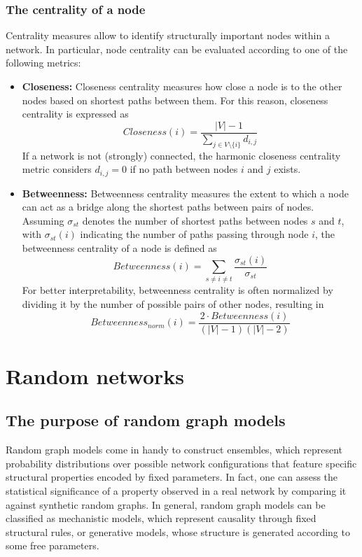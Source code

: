 \documentclass{report}
\begin{document}
\subsection{The centrality of a node}
Centrality measures allow to identify structurally important nodes within a network. \newline
In particular, node centrality can be evaluated according to one of the following metrics:
\begin{itemize}
    \item \textbf{Closeness: }Closeness centrality measures how close a node is to the other nodes based on shortest paths between them. \newline
    For this reason, closeness centrality is expressed as
    \[Closeness(i) = \frac{|V| - 1}{\sum_{j \in V \setminus \{i\}} d_{i, j}}\]
    If a network is not (strongly) connected, the harmonic closeness centrality metric considers $\displaystyle d_{i, j} = 0$ if no path between nodes $\displaystyle i$ and $\displaystyle j$ exists.
    \item \textbf{Betweenness: }Betweenness centrality measures the extent to which a node can act as a bridge along the shortest paths between pairs of nodes. \newline
    Assuming $\displaystyle \sigma_{st}$ denotes the number of shortest paths between nodes $\displaystyle s$ and $\displaystyle t$, with $\displaystyle \sigma_{st}(i)$ indicating the number of paths passing through node $\displaystyle i$, the betweenness centrality of a node is defined as
    \[Betweenness(i) = \sum_{s \neq i \neq t} \frac{\sigma_{st}(i)}{\sigma_{st}}\]
    For better interpretability, betweenness centrality is often normalized by dividing it by the number of possible pairs of other nodes, resulting in
    \[Betweenness_{norm}(i) = \frac{2 \cdot Betweenness(i)}{(|V| - 1)(|V| - 2)}\]
\end{itemize}

\chapter{Random networks}
\section{The purpose of random graph models}
Random graph models come in handy to construct ensembles, which represent probability distributions over possible network configurations that feature specific structural properties encoded by fixed parameters. \newline
In fact, one can assess the statistical significance of a property observed in a real network by comparing it against synthetic random graphs. \newline
In general, random graph models can be classified as mechanistic models, which represent causality through fixed structural rules, or generative models, whose structure is generated according to some free parameters.
\end{document}
